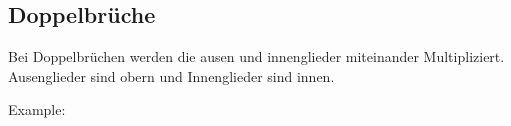 \subsection{Doppelbrüche}

Bei Doppelbrüchen werden die ausen und innenglieder miteinander Multipliziert.\\
Ausenglieder sind obern und Innenglieder sind innen.

\hfill \break
Example:
\fboxrule=0.8pt 
\\